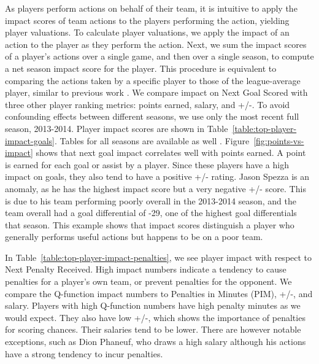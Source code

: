 \documentclass[]{article}
\begin{document}
As players perform actions on behalf of their team, it is intuitive to apply the impact scores of team actions to the players performing the action, yielding player valuations.
To calculate player valuations, we apply the impact of an action to the player as they perform the action.
Next, we sum the impact scores of a player's actions over a single game, and then over a single season, to compute a net season impact score for the player. This procedure is equivalent to comparing the actions taken by a specific player to those of the league-average player, similar to previous work \citep{Pettigrew2015,Cervone2014a}.
We compare impact on Next Goal Scored with three other player ranking metrics: points earned, salary, and +/-.
To avoid confounding effects between different seasons, we use only the most recent full season, 2013-2014.
Player impact scores are shown in Table~\ref{table:top-player-impact-goals}. Tables for all seasons are available as well \citep{Routley2015}.
Figure~\ref{fig:points-vs-impact} shows that next goal impact correlates well with points earned. A point is earned for each goal or assist by a player.
Since these players have a high impact on goals, they also tend to have a positive +/- rating.
Jason Spezza is an anomaly, as he has the highest impact score but a very negative +/- score. This is due to his team performing poorly overall in the 2013-2014 season, and the team overall had a goal differential of -29, one of the highest goal differentials that season. This example shows that impact scores distinguish a player who generally performs useful actions but happens to be on a poor team.

In Table~\ref{table:top-player-impact-penalties}, we see player impact with respect to Next Penalty Received. High impact numbers indicate a tendency to cause penalties for a player's own team, or prevent penalties for the opponent. We compare the Q-function impact numbers to Penalties in Minutes (PIM), +/-, and salary. Players with high Q-function numbers have high penalty minutes as we would expect. They also have low +/-, which shows the importance of penalties for scoring chances. Their salaries tend to be lower. There are however notable exceptions, such as Dion Phaneuf, who draws a high salary although his actions have a strong tendency to incur penalties.
\end{document}
